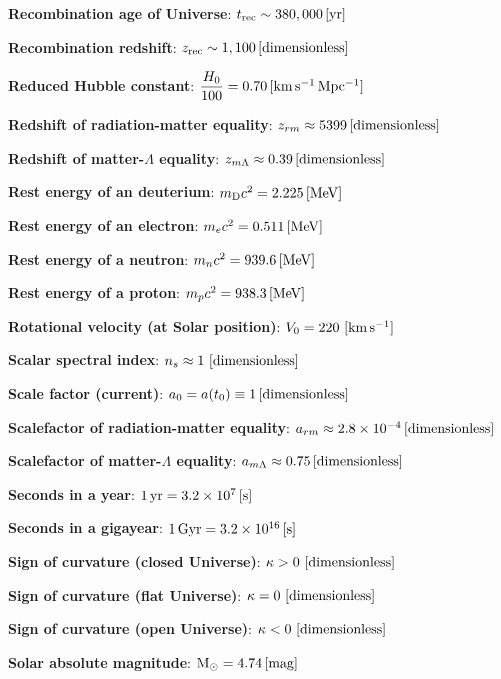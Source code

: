 \documentclass[a4paper,10pt]{article}
\begin{document}
{\noindent}\textbf{Recombination age of Universe}: $t_\mathrm{rec} \sim 380,000\,[{\rm yr}]$

{\noindent}\textbf{Recombination redshift}: $z_\mathrm{rec}\sim1,100\,[{\rm dimensionless}]$

{\noindent}\textbf{Reduced Hubble constant}: $\dfrac{H_0}{100} = 0.70\,[{\rm km\,s^{-1}\,Mpc^{-1}}]$

{\noindent}\textbf{Redshift of radiation-matter equality}: $z_{rm} \approx 5399\,[{\rm dimensionless}]$

{\noindent}\textbf{Redshift of matter-$\Lambda$ equality}: $z_{m\Lambda}
\approx0.39\,[{\rm dimensionless}]$

{\noindent}\textbf{Rest energy of an deuterium}: $m_\mathrm{D}c^2 = 2.225\,[{\rm MeV}]$

{\noindent}\textbf{Rest energy of an electron}: $m_ec^2 = 0.511\,[{\rm MeV}]$

{\noindent}\textbf{Rest energy of a neutron}: $m_nc^2 = 939.6\,[{\rm MeV}]$

{\noindent}\textbf{Rest energy of a proton}: $m_pc^2 = 938.3\,[{\rm MeV}]$

{\noindent}\textbf{Rotational velocity (at Solar position)}: $V_0 = 220 ~ [{\rm km\,s^{-1}}]$

{\noindent}\textbf{Scalar spectral index}: $n_s\approx1 ~ [{\rm dimensionless}]$

{\noindent}\textbf{Scale factor (current)}: $a_0=a(t_0)\equiv1\,[{\rm dimensionless}]$

{\noindent}\textbf{Scalefactor of radiation-matter equality}: $a_{rm} \approx 2.8\times10^{-4}\,[{\rm dimensionless}]$

{\noindent}\textbf{Scalefactor of matter-$\Lambda$ equality}: $a_{m\Lambda}
\approx0.75\,[{\rm dimensionless}]$

{\noindent}\textbf{Seconds in a year}: $1\,{\rm yr} = 3.2\times10^7\,[{\rm s}]$

{\noindent}\textbf{Seconds in a gigayear}: $1\,{\rm Gyr} = 3.2\times10^{16}\,[{\rm s}]$

{\noindent}\textbf{Sign of curvature (closed Universe)}: $\kappa>0 ~ [{\rm dimensionless}]$

{\noindent}\textbf{Sign of curvature (flat Universe)}: $\kappa=0 ~ [{\rm dimensionless}]$

{\noindent}\textbf{Sign of curvature (open Universe)}: $\kappa<0 ~ [{\rm dimensionless}]$

{\noindent}\textbf{Solar absolute magnitude}: ${\rm M}_\odot = 4.74\,[{\rm mag}]$
\end{document}

